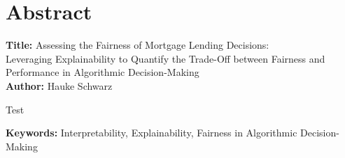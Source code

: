 \chapter*{Abstract}

\noindent
\textbf{Title:} Assessing the Fairness of Mortgage Lending Decisions: \\
Leveraging Explainability to Quantify the Trade-Off between Fairness and Performance in Algorithmic Decision-Making \\ 
\textbf{Author:} Hauke Schwarz
\vspace{1em}


Test


\vspace{3em}

\textbf{Keywords:} Interpretability, Explainability, Fairness in Algorithmic Decision-Making \\